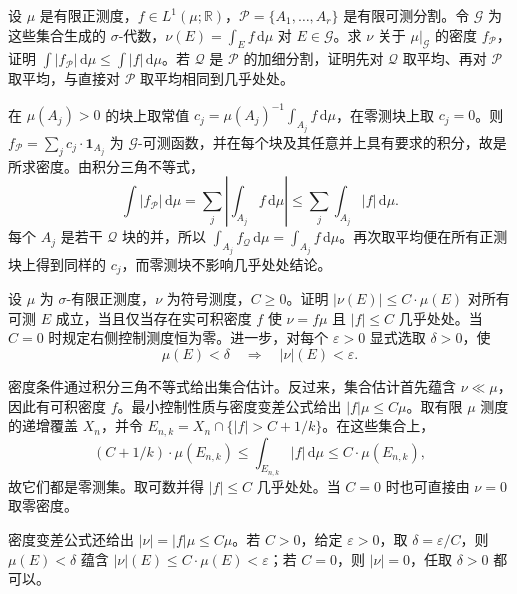 \begin{exercise}\label{b1:ex:06-partition-density}
设 \(\mu\) 是有限正测度，\(f\in L^1(\mu;\mathbb R)\)，\(\mathcal P=\{A_1,\ldots,A_r\}\) 是有限可测分割。令 \(\mathcal G\) 为这些集合生成的 \(\sigma\)-代数，\(\nu(E)=\int_Ef\,\mathrm d\mu\) 对 \(E\in\mathcal G\)。求 \(\nu\) 关于 \(\mu|_{\mathcal G}\) 的密度 \(f_{\mathcal P}\)，证明 \(\int|f_{\mathcal P}|\,\mathrm d\mu\leq\int|f|\,\mathrm d\mu\)。若 \(\mathcal Q\) 是 \(\mathcal P\) 的加细分割，证明先对 \(\mathcal Q\) 取平均、再对 \(\mathcal P\) 取平均，与直接对 \(\mathcal P\) 取平均相同到几乎处处。
\end{exercise}
\begin{solution}
在 \(\mu(A_j)>0\) 的块上取常值 \(c_j=\mu(A_j)^{-1}\int_{A_j}f\,\mathrm d\mu\)，在零测块上取 \(c_j=0\)。则 \(f_{\mathcal P}=\sum_jc_j\cdot\mathbf1_{A_j}\) 为 \(\mathcal G\)-可测函数，并在每个块及其任意并上具有要求的积分，故是所求密度。由积分三角不等式，
\[
\int|f_{\mathcal P}|\,\mathrm d\mu
=\sum_j\left|\int_{A_j}f\,\mathrm d\mu\right|
\leq\sum_j\int_{A_j}|f|\,\mathrm d\mu.
\]
每个 \(A_j\) 是若干 \(\mathcal Q\) 块的并，所以 \(\int_{A_j}f_{\mathcal Q}\,\mathrm d\mu=\int_{A_j}f\,\mathrm d\mu\)。再次取平均便在所有正测块上得到同样的 \(c_j\)，而零测块不影响几乎处处结论。
\end{solution}

\begin{exercise}\label{b1:ex:06-bounded-density}
设 \(\mu\) 为 \(\sigma\)-有限正测度，\(\nu\) 为符号测度，\(C\geq0\)。证明 \(|\nu(E)|\leq C\cdot\mu(E)\) 对所有可测 \(E\) 成立，当且仅当存在实可积密度 \(f\) 使 \(\nu=f\mu\) 且 \(|f|\leq C\) 几乎处处。当 \(C=0\) 时规定右侧控制测度恒为零。进一步，对每个 \(\varepsilon>0\) 显式选取 \(\delta>0\)，使
\[
\mu(E)<\delta\quad\Longrightarrow\quad |\nu|(E)<\varepsilon.
\]
\end{exercise}
\begin{solution}
密度条件通过积分三角不等式给出集合估计。反过来，集合估计首先蕴含 \(\nu\ll\mu\)，因此有可积密度 \(f\)。最小控制性质与密度变差公式给出 \(|f|\mu\leq C\mu\)。取有限 \(\mu\) 测度的递增覆盖 \(X_n\)，并令 \(E_{n,k}=X_n\cap\{|f|>C+1/k\}\)。在这些集合上，
\[
(C+1/k)\cdot\mu(E_{n,k})\leq\int_{E_{n,k}}|f|\,\mathrm d\mu\leq C\cdot\mu(E_{n,k}),
\]
故它们都是零测集。取可数并得 \(|f|\leq C\) 几乎处处。当 \(C=0\) 时也可直接由 \(\nu=0\) 取零密度。

密度变差公式还给出 \(|\nu|=|f|\mu\leq C\mu\)。若 \(C>0\)，给定 \(\varepsilon>0\)，取 \(\delta=\varepsilon/C\)，则 \(\mu(E)<\delta\) 蕴含 \(|\nu|(E)\leq C\cdot\mu(E)<\varepsilon\)；若 \(C=0\)，则 \(|\nu|=0\)，任取 \(\delta>0\) 都可以。
\end{solution}

